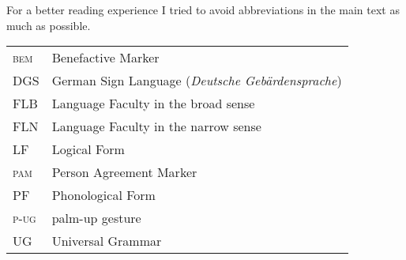 
For a better reading experience I tried to avoid abbreviations in the main text as much as possible.\\

\noindent\begin{tabular}{@{}ll@{}}
\textsc{bem} &  Benefactive Marker \\
DGS & German Sign Language (\textit{Deutsche Geb\"ardensprache})\\
FLB & Language Faculty in the broad sense\\
FLN & Language Faculty in the narrow sense\\
LF & Logical Form \\
\textsc{pam} & Person Agreement Marker \\
PF & Phonological Form \\
\textsc{p-ug} & palm-up gesture\\
UG & Universal Grammar \\
\end{tabular}

